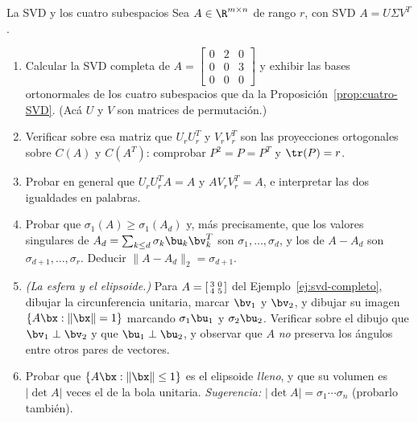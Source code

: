 \begin{entrega}{La SVD y los cuatro subespacios}\label{ent:cuatro-SVD}
Sea $A\in\R^{m\times n}$ de rango $r$, con SVD $A=U\Sigma V^T$.

\begin{enumerate}[label=\textbf{(\alph*)},itemsep=3pt,topsep=4pt]
\item Calcular la SVD completa de
$A=\begin{bmatrix}0&2&0\\ 0&0&3\\ 0&0&0\end{bmatrix}$
y exhibir las bases ortonormales de los cuatro subespacios que da la
Proposición~\ref{prop:cuatro-SVD}. (Acá $U$ y $V$ son matrices de
permutación.)

\item Verificar sobre esa matriz que $U_rU_r^T$ y $V_rV_r^T$ son las
proyecciones ortogonales sobre $C(A)$ y $C(A^T)$: comprobar $P^2=P=P^T$ y
$\tr(P)=r$.

\item Probar en general que $U_rU_r^TA=A$ y $AV_rV_r^T=A$, e interpretar
las dos igualdades en palabras.

\item Probar que $\sigma_1(A)\ge\sigma_1(A_d)$ y, más precisamente, que los
valores singulares de $A_d=\sum_{k\le d}\sigma_k\bu_k\bv_k^T$ son
$\sigma_1,\dots,\sigma_d$, y los de $A-A_d$ son
$\sigma_{d+1},\dots,\sigma_r$. Deducir $\|A-A_d\|_2=\sigma_{d+1}$.

\item \emph{(La esfera y el elipsoide.)} Para
$A=\begin{bsmallmatrix}3&0\\ 4&5\end{bsmallmatrix}$ del
Ejemplo~\ref{ej:svd-completo}, dibujar la circunferencia unitaria, marcar
$\bv_1$ y $\bv_2$, y dibujar su imagen $\{A\bx:\|\bx\|=1\}$ marcando
$\sigma_1\bu_1$ y $\sigma_2\bu_2$. Verificar sobre el dibujo que
$\bv_1\perp\bv_2$ y que $\bu_1\perp\bu_2$, y observar que $A$ \emph{no}
preserva los ángulos entre otros pares de vectores.

\item Probar que $\{A\bx:\|\bx\|\le1\}$ es el elipsoide \emph{lleno}, y que
su volumen es $|\det A|$ veces el de la bola unitaria. \emph{Sugerencia:}
$|\det A|=\sigma_1\cdots\sigma_n$ (probarlo también).
\end{enumerate}

\medskip
{}
\end{entrega}

